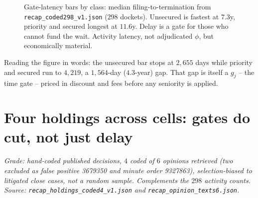 \begin{figure}[h]
\centering
{}
\caption{Gate-latency bars by class: median filing-to-termination from \texttt{recap\_coded298\_v1.json} ($298$ dockets). Unsecured is fastest at $7.3$y, priority and secured longest at $11.6$y. Delay is a gate for those who cannot fund the wait. Activity latency, not adjudicated $\phi$, but economically material.}
\label{fig:gatelatency}
\end{figure}

Reading the figure in words: the unsecured bar stops at $2{,}655$ days while priority and secured run to $4{,}219$, a $1{,}564$-day ($4.3$-year) gap. That gap is itself a $g_j$ -- the time gate -- priced in discount and fees before any seniority is applied.

\section{Four holdings across cells: gates do cut, not just delay}
\label{sec:holdings}

\textit{Grade: hand-coded published decisions, $4$ coded of $6$ opinions retrieved (two excluded as false positive 3679350 and minute order 9327863), selection-biased to litigated close cases, not a random sample. Complements the $298$ activity counts. Source: \texttt{recap\_holdings\_coded4\_v1.json} and \texttt{recap\_opinion\_texts6.json}.}

